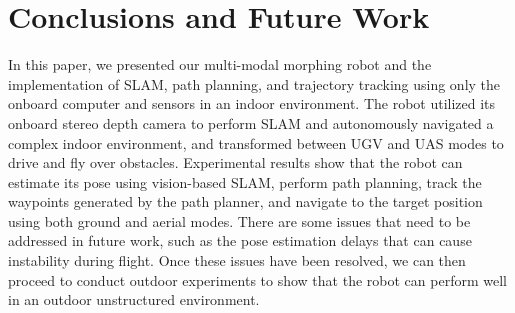 \documentclass[letterpaper, 10 pt, conference]{ieeeconf}  %
\begin{document}
\section{Conclusions and Future Work}


In this paper, we presented our multi-modal morphing robot and the implementation of SLAM, path planning, and trajectory tracking using only the onboard computer and sensors in an indoor environment. The robot utilized its onboard stereo depth camera to perform SLAM and autonomously navigated a complex indoor environment, and transformed between UGV and UAS modes to drive and fly over obstacles. Experimental results show that the robot can estimate its pose using vision-based SLAM, perform path planning, track the waypoints generated by the path planner, and navigate to the target position using both ground and aerial modes. There are some issues that need to be addressed in future work, such as the pose estimation delays that can cause instability during flight. Once these issues have been resolved, we can then proceed to conduct outdoor experiments to show that the robot can perform well in an outdoor unstructured environment.


















\balance{}
 

% 

\end{document}
